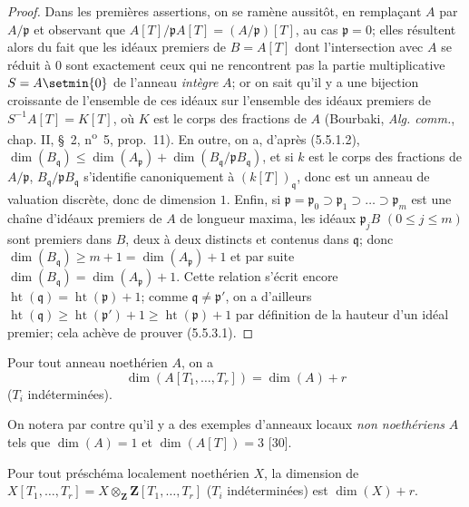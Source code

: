 \begin{proof}
Dans les premières assertions, on se ramène aussitôt, en remplaçant $A$ par
$A/\mathfrak p$ et observant que
$A[T]/\mathfrak pA[T]=(A/\mathfrak p)[T]$, au cas $\mathfrak p=0$; elles
résultent alors du fait que les idéaux premiers de $B=A[T]$ dont
l'intersection avec $A$ se réduit à $0$ sont exactement ceux qui ne
rencontrent pas la partie multiplicative $S=A\setmin\{0\}$ de l'anneau \emph{intègre}
$A$; or on sait qu'il y a une bijection croissante de l'ensemble de ces
idéaux sur l'ensemble des idéaux premiers de $S^{-1}A[T]=K[T]$, où $K$ est
le corps des fractions de $A$ (Bourbaki, \emph{Alg. comm.}, chap. II,
\S~2, n\textsuperscript{o}~5, prop.~11). En outre, on a, d'après (5.5.1.2),
$\dim(B_{\mathfrak q})\leq\dim(A_{\mathfrak p})
+\dim(B_{\mathfrak q}/\mathfrak pB_{\mathfrak q})$, et si $k$ est le corps des fractions de $A/\mathfrak p$,
$B_{\mathfrak q}/\mathfrak pB_{\mathfrak q}$ s'identifie canoniquement à
$(k[T])_{\mathfrak q}$, donc est un anneau de valuation discrète, donc de
dimension $1$. Enfin, si
$\mathfrak p=\mathfrak p_0\supset\mathfrak p_1\supset\ldots
\supset\mathfrak p_m$ est une chaîne d'idéaux premiers de $A$ de longueur
maxima, les idéaux $\mathfrak p_jB$ $(0\leq j\leq m)$ sont premiers dans
$B$, deux à deux distincts et contenus dans $\mathfrak q$; donc
$\dim(B_{\mathfrak q})\geq m+1=\dim(A_{\mathfrak p})+1$ et par suite
$\dim(B_{\mathfrak q})=\dim(A_{\mathfrak p})+1$. Cette relation s'écrit
encore $\operatorname{ht}(\mathfrak q)=\operatorname{ht}(\mathfrak p)+1$;
comme $\mathfrak q\ne\mathfrak p'$, on a d'ailleurs
$\operatorname{ht}(\mathfrak q)\geq\operatorname{ht}(\mathfrak p')+1
\geq\operatorname{ht}(\mathfrak p)+1$ par définition de la hauteur d'un
idéal premier; cela achève de prouver (5.5.3.1).
\end{proof}

\begin{corollary}[5.5.4]
Pour tout anneau noethérien $A$, on a
\begin{equation}
\dim(A[T_1,\ldots,T_r])=\dim(A)+r
\tag{5.5.4.1}\label{IV.2.s5.5.4.1-fr}
\end{equation}
($T_i$ indéterminées).
\end{corollary}

On notera par contre qu'il y a des exemples d'anneaux locaux \emph{non noethériens}
$A$ tels que $\dim(A)=1$ et $\dim(A[T])=3$ [30].

\begin{corollary}[5.5.5]
\label{IV.2.s5.5.5-fr}
Pour tout préschéma localement noethérien $X$, la dimension de
$X[T_1,\ldots,T_r]=X\otimes_{\mathbf Z}\mathbf Z[T_1,\ldots,T_r]$
($T_i$ indéterminées) est $\dim(X)+r$.
\end{corollary}

